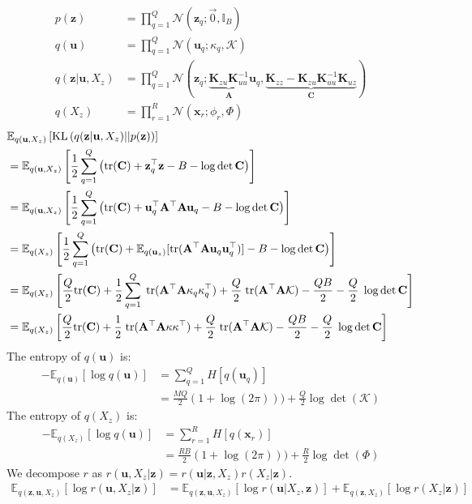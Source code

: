 \documentclass[12pt]{article}
\newcommand{\Kappa}{\mathcal{K}}
\newcommand{\xb}{\mathbf{x}}
\newcommand{\ub}{\mathbf{u}}
\newcommand{\zb}{\mathbf{z}}
\newcommand{\Cb}{\mathbf{C}}
\newcommand{\Ab}{\mathbf{A}}
\newcommand{\Kzz}{\mathbf{K}_{zz}}
\newcommand{\Kuu}{\mathbf{K}_{uu}}
\newcommand{\Kuz}{\mathbf{K}_{uz}}
\newcommand{\Kzu}{\mathbf{K}_{zu}}
\newcommand{\Ex}{\mathbb{E}}
\newcommand{\KL}{\mathrm{KL}}
\newcommand{\tr}{\mathrm{tr}}
\begin{document}
\begin{align}
p(\zb) &= \prod_{q=1}^Q \mathcal{N}(\zb_q; \vec{0}, \mathbb{I}_B) \\
q(\ub) &= \prod_{q=1}^Q \mathcal{N}(\ub_q; \kappa_q, \Kappa) \\
q(\zb|\ub,X_z) &= \prod_{q=1}^Q \mathcal{N}(\zb_q; \underbrace{\Kzu\Kuu^{-1}}_{\Ab}\ub_q, \underbrace{\Kzz-\Kzu\Kuu^{-1}\Kuz}_{\Cb}) \\
q(X_z) &= \prod_{r=1}^R \mathcal{N}(\xb_r; \phi_r, \Phi)
\end{align}
%
\begin{align}
&\Ex_{q(\ub,X_z)}\left[\KL\left(q(\zb|\ub,X_z)||p(\zb)\right)\right] \notag \\
&= \Ex_{q(\ub,X_z)}\left[\frac{1}{2}\sum_{q=1}^Q \left(\tr(\Cb) + \zb_q^\top\zb - B -  \log\det\Cb \right)\right] \\
&= \Ex_{q(\ub,X_z)}\left[\frac{1}{2}\sum_{q=1}^Q \left(\tr(\Cb) + \ub_q^\top\Ab^\top\Ab\ub_q - B -  \log\det\Cb \right)\right] \\
&=\Ex_{q(X_z)}\left[\frac{1}{2}\sum_{q=1}^Q \left(\tr(\Cb) + \Ex_{q(\ub_z)}[\tr(\Ab^\top\Ab\ub_q\ub_q^\top)] - B -  \log\det\Cb \right)\right] \\
&=\Ex_{q(X_z)}\left[\frac{Q}{2}\tr(\Cb) + \frac{1}{2}\sum_{q=1}^Q\;\tr(\Ab^\top\Ab\kappa_q\kappa_q^\top) + \frac{Q}{2}\;\tr(\Ab^\top\Ab\Kappa) - \frac{QB}{2} -  \frac{Q}{2}\;\log\det\Cb \right] \\
&=\Ex_{q(X_z)}\left[\frac{Q}{2}\tr(\Cb) + \frac{1}{2}\;\tr(\Ab^\top\Ab\kappa\kappa^\top) + \frac{Q}{2}\;\tr(\Ab^\top\Ab\Kappa) - \frac{QB}{2} -  \frac{Q}{2}\;\log\det\Cb \right]
\end{align}
%
The entropy of $q(\ub)$ is:
%
\begin{align}
-\Ex_{q(\ub)}\left[\log q(\ub)\right] &= \sum_{q=1}^Q H[q(\ub_q)] \\
&= \frac{MQ}{2}(1+\log(2\pi))) + \frac{Q}{2}\log\det(\Kappa)
\end{align}
%
The entropy of $q(X_z)$ is:
%
\begin{align}
-\Ex_{q(X_z)}\left[\log q(\ub)\right] &= \sum_{r=1}^R H[q(\xb_r)] \\
&= \frac{RB}{2}(1+\log(2\pi))) + \frac{R}{2}\log\det(\Phi)
\end{align}
%
We decompose $r$ as $r(\ub,X_z|\zb) = r(\ub|\zb,X_z)r(X_z|\zb)$. 
%
\begin{align}
\Ex_{q(\zb,\ub,X_z)}\left[\log r(\ub,X_z|\zb)\right] &= \Ex_{q(\zb,\ub,X_z)}\left[\log r(\ub|X_z,\zb)\right] + \Ex_{q(\zb,X_z)}\left[\log r(X_z|\zb)\right] 
\end{align}
\end{document}
